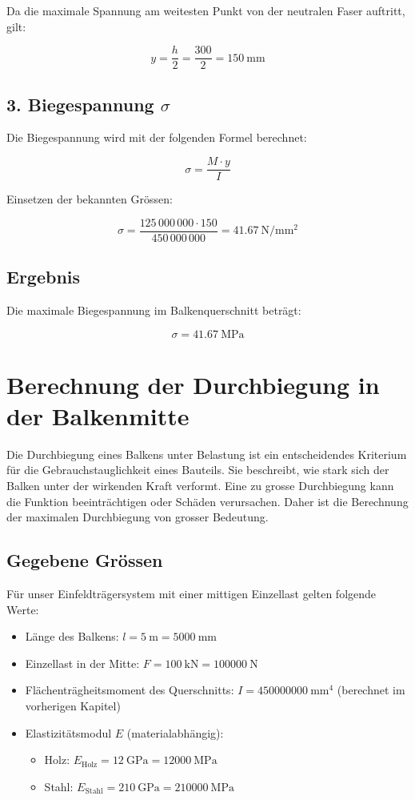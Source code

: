 Da die maximale Spannung am weitesten Punkt von der neutralen Faser auftritt, gilt:

\[
y = \frac{h}{2} = \frac{300}{2} = \SI{150}{\milli\meter}
\]

\subsection*{3. Biegespannung $\sigma$}

Die Biegespannung wird mit der folgenden Formel berechnet:

\[
\sigma = \frac{M \cdot y}{I}
\]

Einsetzen der bekannten Grössen:

\[
\sigma = \frac{125\,000\,000 \cdot 150}{450\,000\,000} = \SI{41.67}{\newton\per\milli\meter\squared}
\]

\subsection*{Ergebnis}

Die maximale Biegespannung im Balkenquerschnitt beträgt:

\[
\boxed{\sigma = \SI{41.67}{\mega\pascal}}
\]


\section*{Berechnung der Durchbiegung in der Balkenmitte}

Die Durchbiegung eines Balkens unter Belastung ist ein entscheidendes Kriterium für die Gebrauchstauglichkeit eines Bauteils. 
Sie beschreibt, wie stark sich der Balken unter der wirkenden Kraft verformt. 
Eine zu grosse Durchbiegung kann die Funktion beeinträchtigen oder Schäden verursachen. 
Daher ist die Berechnung der maximalen Durchbiegung von grosser Bedeutung.

\subsection*{Gegebene Grössen}

Für unser Einfeldträgersystem mit einer mittigen Einzellast gelten folgende Werte:

\begin{itemize}
  \item Länge des Balkens: \( l = \SI{5}{\meter} = \SI{5000}{\milli\meter} \)
  \item Einzellast in der Mitte: \( F = \SI{100}{\kilo\newton} = \SI{100000}{\newton} \)
  \item Flächenträgheitsmoment des Querschnitts: \( I = \SI{450000000}{\milli\meter^4} \) (berechnet im vorherigen Kapitel)
  \item Elastizitätsmodul \( E \) (materialabhängig):
  \begin{itemize}
    \item Holz: \( E_{\text{Holz}} = \SI{12}{\giga\pascal} = \SI{12000}{\mega\pascal} \)
    \item Stahl: \( E_{\text{Stahl}} = \SI{210}{\giga\pascal} = \SI{210000}{\mega\pascal} \)
  \end{itemize}
\end{itemize}

